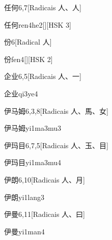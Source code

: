 \begin{entry}{任何}{6,7}[Radicais ⼈、⼈]
  \begin{phonetics}{任何}{ren4he2}[][HSK 3]
  \end{phonetics}
\end{entry}

\begin{entry}{份}{6}[Radical ⼈]
  \begin{phonetics}{份}{fen4}[][HSK 2]
  \end{phonetics}
\end{entry}

\begin{entry}{企业}{6,5}[Radicais ⼈、⼀]
  \begin{phonetics}{企业}{qi3ye4}
  \end{phonetics}
\end{entry}

\begin{entry}{伊马姆}{6,3,8}[Radicais ⼈、⾺、⼥]
  \begin{phonetics}{伊马姆}{yi1ma3mu3}
  \end{phonetics}
\end{entry}

\begin{entry}{伊玛目}{6,7,5}[Radicais ⼈、⽟、⽬]
  \begin{phonetics}{伊玛目}{yi1ma3mu4}
  \end{phonetics}
\end{entry}

\begin{entry}{伊朗}{6,10}[Radicais ⼈、⽉]
  \begin{phonetics}{伊朗}{yi1lang3}
  \end{phonetics}
\end{entry}

\begin{entry}{伊曼}{6,11}[Radicais ⼈、⽈]
  \begin{phonetics}{伊曼}{yi1man4}
  \end{phonetics}
\end{entry}

